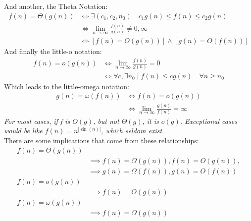 \documentclass[nobib]{tufte-handout}
\begin{document}
And another, the Theta Notation:
\begin{align*}
    f(n)=\Theta(g(n)) & \iff \exists(c_1,c_2,n_0)\quad c_1g(n)\leq f(n)\leq c_2g(n)  \\
                      & \iff \lim_{n\rightarrow\infty}\frac{f(n)}{g(n)}\neq 0,\infty \\
                      & \iff [f(n) = O(g(n))] \land [g(n) = O(f(n))]
\end{align*}
And finally the little-o notation:
\begin{align*}
    f(n) = o(g(n)) & \iff \lim_{n\rightarrow\infty}\frac{f(n)}{g(n)} = 0                    \\
                   & \iff \forall c,\exists n_0 \mid f(n)\leq cg(n) \quad \forall n\geq n_0
\end{align*}
Which leads to the little-omega notation:
\begin{align*}
    g(n) = \omega(f(n)) & \iff f(n) = o(g(n))                                      \\
                        & \iff \lim_{n\rightarrow\infty}\frac{g(n)}{f(n)} = \infty
\end{align*}
\textit{For most cases, if f is $O(g)$, but not $\Theta(g)$, it is $o(g)$. Exceptional cases would be like $f(n) = n^{|\sin(n)|}$, which seldom exist.}\\
There are some implications that come from these relationships:
\begin{align*}
    f(n) = \Theta(g(n)) &\\
    &\implies f(n) = \Omega(g(n)), f(n)= O(g(n)),\\
    &\implies g(n) =\Omega(f(n)), g(n) = O(f(n))\\
    f(n) = o(g(n)) &\\
    &\implies f(n) = O(g(n))\\
    f(n) = \omega(g(n)) &\\
    &\implies f(n) = \Omega(g(n))
\end{align*}
\end{document}
